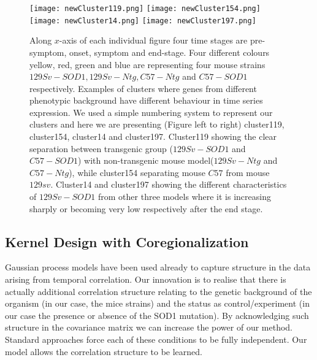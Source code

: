 \begin{figure}
 \begin{center}
 \texttt{[image: newCluster119.png]}
 \texttt{[image: newCluster154.png]}
 \texttt{[image: newCluster14.png]}
 \texttt{[image: newCluster197.png]}
  \caption [Few examples of clusters with different dynamics]
  {Along $x$-axis of each individual figure four time stages are pre-symptom, onset, symptom and end-stage. Four different colours yellow, red, green and blue are representing four mouse strains $129Sv-SOD1, 129Sv-Ntg, C57-Ntg$ and $C57-SOD1$ respectively. Examples of clusters where genes from different phenotypic background have different behaviour in time series expression. We used a simple numbering system to represent our clusters and here we are presenting (Figure left to  right) cluster119, cluster154, cluster14 and cluster197. Cluster119 showing the clear separation between transgenic group ($129Sv-SOD1$ and $C57-SOD1$) with non-transgenic mouse model($129Sv-Ntg$ and $C57-Ntg$), while cluster154 separating mouse $C57$ from mouse $129sv$. Cluster14 and cluster197 showing the different characteristics of $129Sv-SOD1$ from other three models where it is increasing sharply or becoming very low respectively after the end stage. \label{fig:fourSampleClusters}}
 \end{center}
\end{figure}

\subsection{Kernel Design with Coregionalization}
Gaussian process models have been used already to capture structure in the data arising from temporal correlation. Our innovation is to realise that there is actually additional correlation structure relating to the genetic background of the organism (in our case, the mice strains) and the status as control/experiment (in our case the presence or absence of the SOD1 mutation). By acknowledging such structure in the covariance matrix we can increase the power of our method. Standard approaches force each of these conditions to be fully independent. Our model allows the correlation structure to be learned.


